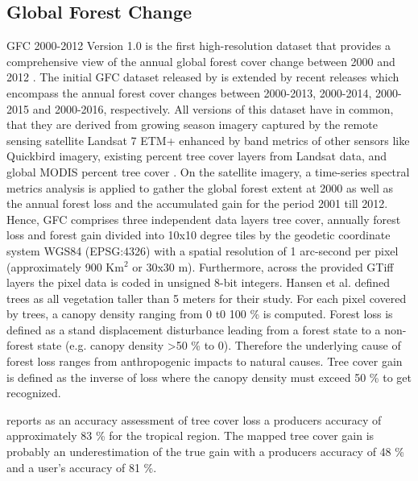 	\subsection{Global Forest Change}
		\ac{GFC} 2000-2012 Version 1.0 is the first high-resolution dataset that provides a comprehensive view of the annual global forest cover change between 2000 and 2012 \citep{Hansen2013,Li2017}. The initial \ac{GFC} dataset released by \citeauthor{Hansen2013} is extended by recent releases which encompass the annual forest cover changes between 2000-2013, 2000-2014, 2000-2015 and 2000-2016, respectively. All versions of this dataset have in common, that they are derived from growing season imagery captured by the remote sensing satellite Landsat 7 \ac{ETM+} enhanced by band metrics of other sensors like Quickbird imagery, existing percent tree cover layers from Landsat data, and global \ac{MODIS} percent tree cover \citep{Hansen2013}. On the satellite imagery, a time-series spectral metrics analysis is applied to gather the global forest extent at 2000 as well as the annual forest loss and the accumulated gain for the period 2001 till 2012. Hence, \ac{GFC} comprises three independent data layers tree cover, annually forest loss and forest gain divided into 10x10 degree tiles by the geodetic coordinate system \ac{WGS84} (EPSG:4326) with a spatial resolution of 1 arc-second per pixel (approximately 900 Km$^2$ or 30x30 m). Furthermore, across the provided \ac{GTiff} layers the pixel data is coded in unsigned 8-bit integers. Hansen et al. defined trees as all vegetation taller than 5 meters for their study. For each pixel covered by trees, a canopy density ranging from 0 t0 100 \% is computed. Forest loss is defined as a stand displacement disturbance leading from a forest state to a non-forest state (e.g. canopy density >50 \% to 0). Therefore the underlying cause of forest loss ranges from anthropogenic impacts to natural causes. Tree cover gain is defined as the inverse of loss where the canopy density must exceed 50 \% to get recognized.

		\citeauthor{Hansen2013} reports as an accuracy assessment of tree cover loss a producers accuracy of approximately 83 \% for the tropical region. The mapped tree cover gain is probably an underestimation of the true gain with a producers accuracy of 48 \% and a user's accuracy of 81 \%. 

